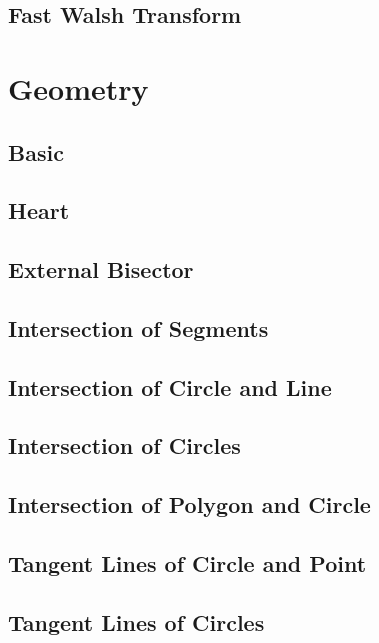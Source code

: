\subsection{Fast Walsh Transform}


\section{Geometry}
\subsection{Basic}

\subsection{Heart}

\subsection{External Bisector}

\subsection{Intersection of Segments}

\subsection{Intersection of Circle and Line}

\subsection{Intersection of Circles}

\subsection{Intersection of Polygon and Circle}

\subsection{Tangent Lines of Circle and Point}

\subsection{Tangent Lines of Circles}

